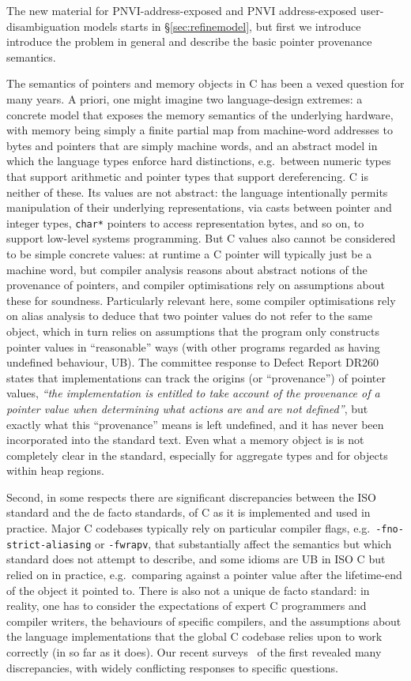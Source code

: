\documentclass[acmsmall,review,screen]{acmart}\settopmatter{printfolios=true,printccs=false,printacmref=false}
\begin{document}
The new material for PNVI-address-exposed and PNVI address-exposed
user-disambiguation models starts in \S\ref{sec:refinemodel}, but
first we introduce introduce the problem in general and describe the
basic pointer provenance semantics. 

The semantics of pointers and memory objects in C has been a vexed 
question for many years. 
%
A priori, one might imagine two language-design extremes: 
%
a concrete model that exposes the memory semantics of the underlying
hardware, with memory being simply a finite partial map from
machine-word addresses to bytes and pointers that are simply machine words,
%
and an abstract model in which the language types enforce hard
distinctions, e.g.~between numeric types that support arithmetic and
pointer types that support dereferencing.
%
C is neither of these.
Its values are not abstract: the language intentionally permits manipulation of their
underlying representations, via casts between pointer and integer
types, \texttt{char*} pointers to access representation bytes, and so on,
to support low-level systems programming.
%
But C values also cannot be considered to be simple concrete values: 
at runtime a C pointer will typically just be a machine word, 
but compiler analysis reasons about abstract notions of the 
provenance of pointers, 
and compiler optimisations rely on assumptions about these for soundness. 
Particularly relevant here, 
some compiler optimisations rely on alias analysis to deduce that two
pointer values do not refer to the same object, which in turn
relies on assumptions that the program only constructs pointer values
in ``reasonable'' ways (with other programs regarded as having
undefined behaviour, UB).  The committee response to Defect Report
DR260~\cite{dr260} states that implementations can track the origins (or ``provenance'')
of pointer values, 
\emph{``the implementation is entitled to take account of the
 provenance of a pointer value when determining what actions are and
  are not defined''}, but exactly what this ``provenance'' means is
left undefined, and it has never been incorporated into the standard
text.   Even what a memory object is is not completely
clear in the standard, especially for aggregate types and for objects
within heap
regions.  

Second, in some respects there are significant discrepancies between
the ISO standard and the de facto standards, of C as it is implemented
and used in practice.  
Major C codebases typically rely on particular
compiler flags, e.g.~\texttt{-fno-strict-aliasing} or
\texttt{-fwrapv}, that substantially affect the semantics but which
standard does not attempt to describe, and 
some idioms are UB in ISO C but
relied on in practice, e.g.~comparing against a pointer value after 
the lifetime-end of the object it pointed to.
%
There is also not a unique de facto standard: in reality, one has
to consider
the expectations of expert C programmers and compiler writers,
the behaviours of specific compilers,
and 
the assumptions about the language implementations that the global C
   codebase relies upon to work correctly (in so far as it does). 
%
Our recent surveys~\cite{Cerberus-PLDI16,N2015} of the first revealed many
discrepancies, with widely conflicting responses to specific questions.
\end{document}
